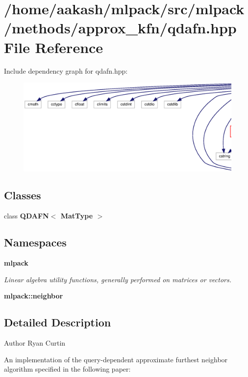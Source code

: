 \section{/home/aakash/mlpack/src/mlpack/methods/approx\+\_\+kfn/qdafn.hpp File Reference}
\label{qdafn_8hpp}
Include dependency graph for qdafn.\+hpp\+:
\nopagebreak
\begin{figure}[H]
\begin{center}
\leavevmode
\includegraphics[width=350pt]{qdafn_8hpp__incl}
\end{center}
\end{figure}
\subsection*{Classes}
\begin{DoxyCompactItemize}
\item 
class \textbf{ Q\+D\+A\+F\+N$<$ Mat\+Type $>$}
\end{DoxyCompactItemize}
\subsection*{Namespaces}
\begin{DoxyCompactItemize}
\item 
 \textbf{ mlpack}
\begin{DoxyCompactList}\small\item\em Linear algebra utility functions, generally performed on matrices or vectors. \end{DoxyCompactList}\item 
 \textbf{ mlpack\+::neighbor}
\end{DoxyCompactItemize}


\subsection{Detailed Description}
\begin{DoxyAuthor}{Author}
Ryan Curtin
\end{DoxyAuthor}
An implementation of the query-\/dependent approximate furthest neighbor algorithm specified in the following paper\+:



